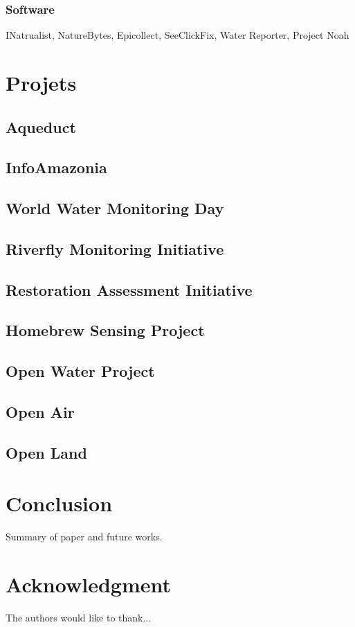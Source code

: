 \documentclass[10pt, conference, compsocconf]{llncs}
\begin{document}
\subsubsection{Software}
INatrualist, NatureBytes, Epicollect, SeeClickFix, Water Reporter, Project Noah	

\section{Projets}
\subsection{Aqueduct}
\subsection{InfoAmazonia}
\subsection{World Water Monitoring Day}
\subsection{Riverfly Monitoring Initiative}
\subsection{Restoration Assessment Initiative}
\subsection{Homebrew Sensing Project}
\subsection{Open Water Project}
\subsection{Open Air}
\subsection{Open Land}

\section{Conclusion}\label{sec:conclusion}
Summary of paper and future works.



\section*{Acknowledgment}
The authors would like to thank...





\end{document}
